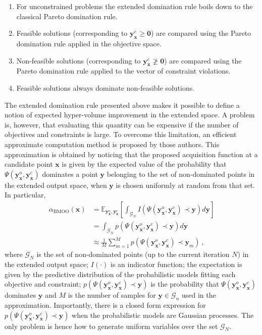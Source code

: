 \begin{enumerate}
\item For unconstrained problems the extended domination rule boils down to the classical Pareto domination rule.
\item Feasible solutions (corresponding to $\mathbf{y}^c_\mathbf{x} \geq \mathbf{0}$) are compared using the
        Pareto domination rule applied in the objective space.
\item Non-feasible solutions (corresponding to $\mathbf{y}^c_\mathbf{x} \ngeq \mathbf{0}$)
         are compared using the Pareto domination rule applied to the vector of constraint violations.
\item Feasible solutions always dominate non-feasible solutions.
\end{enumerate}
The extended domination rule presented above makes it possible to define a notion of expected hyper-volume
improvement in the extended space. A problem is, however, that evaluating this quantity can be expensive if the number of objectives and constraints is large. To overcome this limitation, an efficient approximate computation method is proposed by those authors.
This approximation is obtained by noticing that the proposed acquisition function at a candidate point $\mathbf{x}$
is given by the expected value of the probability that $\Psi(\mathbf{y}_\mathbf{x}^o,\mathbf{y}_\mathbf{x}^c)$
dominates a point $\mathbf{y}$ belonging to the set of non-dominated points in the extended output space,
when $\mathbf{y}$ is chosen uniformly at random from that set. In particular,
\begin{align}
\alpha_\text{BMOO}(\mathbf{x}) &= \mathds{E}_{\mathbf{y}_\mathbf{x}^o,\mathbf{y}_\mathbf{x}^c}\left[ \int_{\mathcal{G}_N} 
        I(\Psi(\mathbf{y}_\mathbf{x}^o,\mathbf{y}_\mathbf{x}^c) \prec \mathbf{y}) d \mathbf{y} \right]
        \nonumber \\
        & =  \int_{\mathcal{G}_N} p(\Psi(\mathbf{y}_\mathbf{x}^o,\mathbf{y}_\mathbf{x}^c) \prec \mathbf{y}) d \mathbf{y}
        \nonumber \\
        & \approx \frac{1}{M} \sum_{m=1}^M  p(\Psi(\mathbf{y}_\mathbf{x}^o,\mathbf{y}_\mathbf{x}^c) \prec \mathbf{y}_m)
        \,,
        \label{eq:acc_bmoo}
\end{align}
where $\mathcal{G}_N$ is the set of non-dominated points (up to the current iteration $N$) in the
extended output space; $I(\cdot)$ is an indicator function;
the expectation is given by the predictive distribution of the probabilistic models fitting each objective and constraint;
$p(\Psi(\mathbf{y}_\mathbf{x}^o,\mathbf{y}_\mathbf{x}^c) \prec \mathbf{y})$ is the probability that
$\Psi(\mathbf{y}_\mathbf{x}^o,\mathbf{y}_\mathbf{x}^c)$ dominates $\mathbf{y}$ and $M$ is the number of samples for
$\mathbf{y} \in \mathcal{G}_n$ used in the approximation. Importantly, there is a closed form expression for
$p(\Psi(\mathbf{y}_\mathbf{x}^o,\mathbf{y}_\mathbf{x}^c) \prec \mathbf{y})$ when the probabilistic
models are Gaussian processes. The only problem is hence how to generate uniform variables over the set $\mathcal{G}_N$.

